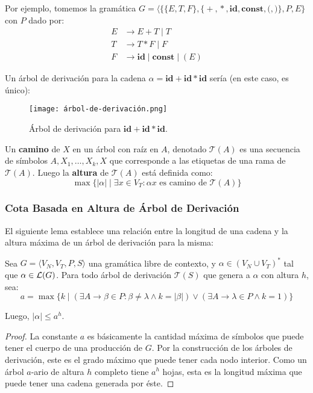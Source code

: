 Por ejemplo, tomemos la gramática $G = \langle \{\{E, T, F\}, \{\mathop{+}, \mathop{*}, \textbf{id}, \textbf{const}, \mathrm{(}, \mathrm{)}\}, P, E\}$ con $P$ dado por:
$$
    \begin{aligned}
        E & \to E + T \mid T                             \\
        T & \to T * F \mid F                             \\
        F & \to \textbf{id} \mid \textbf{const} \mid (E)
    \end{aligned}
$$

Un árbol de derivación para la cadena $\alpha = \textbf{id} + \textbf{id} * \textbf{id}$ sería (en este caso, es único):
\begin{figure}[H]
    \centering
    \texttt{[image: árbol-de-derivación.png]}
    \caption*{Árbol de derivación para $\textbf{id} + \textbf{id} * \textbf{id}$.}
\end{figure}

Un \textbf{camino} de $X$ en un árbol con raíz en $A$, denotado $\mathcal T(A)$ es una secuencia de símbolos $A, X_1, \dots, X_k, X$ que corresponde a las etiquetas de una rama de $\mathcal T(A)$. Luego la \textbf{altura} de $\mathcal T(A)$ está definida como:
$$
    \max \{|\alpha| \mid \exists x \in V_T : \alpha x \text{ es camino de } \mathcal T(A)\}
$$

\subsubsection{Cota Basada en Altura de Árbol de Derivación}

El siguiente lema establece una relación entre la longitud de una cadena y la altura máxima de un árbol de derivación para la misma:

\begin{lemma*}
    Sea $G = \langle V_N, V_T, P, S \rangle$ una gramática libre de contexto, y $\alpha \in (V_N \cup V_T)^*$ tal que $\alpha \in \mathcal{L}(G)$. Para todo árbol de derivación $\mathcal T(S)$ que genera a $\alpha$ con altura $h$, sea:
    $$
        a = \max\{k \mid (\exists A \to \beta \in P : \beta \neq \lambda \land k = |\beta|) \lor (\exists A \to \lambda \in P \land k = 1)\}
    $$

    Luego, $|\alpha| \leq a^h$.
\end{lemma*}
\begin{proof}
    La constante $a$ es básicamente la cantidad máxima de símbolos que puede tener el cuerpo de una producción de $G$. Por la construcción de los árboles de derivación, este es el grado máximo que puede tener cada nodo interior. Como un árbol $a$-ario de altura $h$ completo tiene $a^h$ hojas, esta es la longitud máxima que puede tener una cadena generada por éste.
\end{proof}

